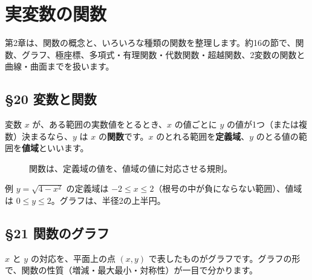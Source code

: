 \documentclass[a4paper,11pt,openany]{ltjsbook}
\begin{document}
\chapter{実変数の関数}

第2章は、関数の概念と、いろいろな種類の関数を整理します。約16の節で、関数、グラフ、極座標、多項式・有理関数・代数関数・超越関数、2変数の関数と曲線・曲面までを扱います。

\section{§20 変数と関数}

変数 $x$ が、ある範囲の実数値をとるとき、$x$ の値ごとに $y$ の値が1つ（または複数）決まるなら、$y$ は $x$ の\textbf{関数}です。$x$ のとれる範囲を\textbf{定義域}、$y$ のとる値の範囲を\textbf{値域}といいます。

\begin{figure}[htbp]
\centering
{}
\caption{関数は、定義域の値を、値域の値に対応させる規則。}
\end{figure}

\begin{examplebox}{例}
$y=\sqrt{4-x^2}$ の定義域は $-2\le x\le2$（根号の中が負にならない範囲）、値域は $0\le y\le2$。グラフは、半径2の上半円。
\end{examplebox}

\section{§21 関数のグラフ}

$x$ と $y$ の対応を、平面上の点 $(x,y)$ で表したものがグラフです。グラフの形で、関数の性質（増減・最大最小・対称性）が一目で分かります。
\end{document}
